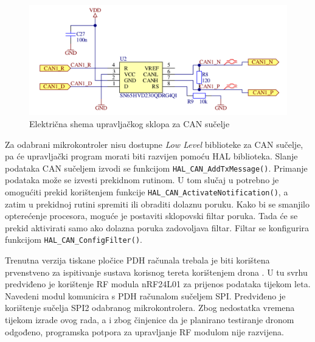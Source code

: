 \begin{figure}[htb]
    \centering
    \includegraphics[width=\textwidth]{slike/can.png}
    \caption{Električna shema upravljačkog sklopa za CAN sučelje \cite{zavrsni_filip_juric}}
    \label{fig:can}
\end{figure}

Za odabrani mikrokontroler nisu dostupne \textit{Low Level} biblioteke za CAN sučelje, pa će upravljački program morati biti razvijen pomoću HAL biblioteka. Slanje podataka CAN sučeljem izvodi se funkcijom \texttt{HAL\_CAN\_AddTxMessage()}. Primanje podataka može se izvesti prekidnom rutinom. U tom slučaj u potrebno je omogućiti prekid korištenjem funkcije \texttt{HAL\_CAN\_ActivateNotification()}, a zatim u prekidnoj rutini spremiti ili obraditi dolaznu poruku. Kako bi se smanjilo opterećenje procesora, moguće je postaviti sklopovski filtar poruka. Tada će se prekid aktivirati samo ako dolazna poruka zadovoljava filtar. Filtar se konfigurira funkcijom \texttt{HAL\_CAN\_ConfigFilter()}.

Trenutna verzija tiskane pločice PDH računala trebala je biti korištena prvenstveno za ispitivanje sustava korisnog tereta korištenjem drona \cite{zavrsni_filip_juric}. U tu svrhu predviđeno je korištenje RF modula nRF24L01 za prijenos podataka tijekom leta. Navedeni modul komunicira s PDH računalom sučeljem SPI. Predviđeno je korištenje sučelja SPI2 odabranog mikrokontrolera. Zbog nedostatka vremena tijekom izrade ovog rada, a i zbog činjenice da je planirano testiranje dronom odgođeno, programska potpora za upravljanje RF modulom nije razvijena.